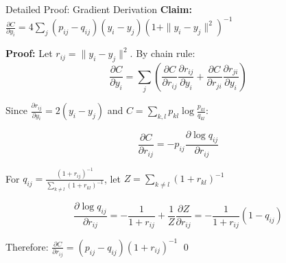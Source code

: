 \begin{frame}{Detailed Proof: Gradient Derivation}
\small
\textbf{Claim:} $\frac{\partial C}{\partial y_i} = 4\sum_j (p_{ij} - q_{ij})(y_i - y_j)(1 + \|y_i - y_j\|^2)^{-1}$

\textbf{Proof:}
Let $r_{ij} = \|y_i - y_j\|^2$. By chain rule:
$$\frac{\partial C}{\partial y_i} = \sum_j \left(\frac{\partial C}{\partial r_{ij}}\frac{\partial r_{ij}}{\partial y_i} + \frac{\partial C}{\partial r_{ji}}\frac{\partial r_{ji}}{\partial y_i}\right)$$

Since $\frac{\partial r_{ij}}{\partial y_i} = 2(y_i - y_j)$ and $C = \sum_{k,l} p_{kl}\log\frac{p_{kl}}{q_{kl}}$:

$$\frac{\partial C}{\partial r_{ij}} = -p_{ij}\frac{\partial \log q_{ij}}{\partial r_{ij}}$$

For $q_{ij} = \frac{(1+r_{ij})^{-1}}{\sum_{k \neq l}(1+r_{kl})^{-1}}$, let $Z = \sum_{k \neq l}(1+r_{kl})^{-1}$

$$\frac{\partial \log q_{ij}}{\partial r_{ij}} = -\frac{1}{1+r_{ij}} + \frac{1}{Z}\frac{\partial Z}{\partial r_{ij}} = -\frac{1}{1+r_{ij}}(1 - q_{ij})$$

Therefore: $\frac{\partial C}{\partial r_{ij}} = (p_{ij} - q_{ij})(1+r_{ij})^{-1}$ \qed
\end{frame}


